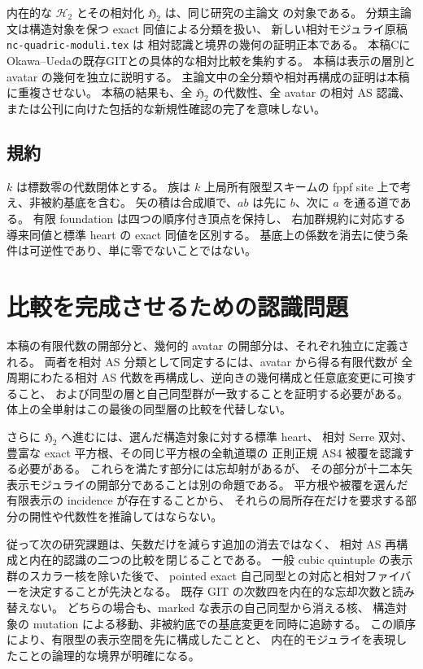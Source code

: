 \documentclass[a4paper,11pt]{ltjsarticle}
\numberwithin{equation}{section}
\theoremstyle{plain}
\theoremstyle{definition}
\theoremstyle{remark}
\newcommand{\kk}{k}
\newcommand{\HH}{\mathcal H_2}
\newcommand{\HHstack}{\mathfrak H_2}
\begin{document}
内在的な $\HH$ とその相対化 $\HHstack$ は、同じ研究の主論文
\cite{QuadricIntrinsic2026} の対象である。
分類主論文は構造対象を保つ exact 同値による分類を扱い、
新しい相対モジュライ原稿 \texttt{nc-quadric-moduli.tex} は
相対認識と境界の幾何の証明正本である。
本稿CにOkawa--Uedaの既存GITとの具体的な相対比較を集約する。
本稿は表示の層別と avatar の幾何を独立に説明する。
主論文中の全分類や相対再構成の証明は本稿に重複させない。
本稿の結果も、全 $\HHstack$ の代数性、全 avatar の相対 AS 認識、
または公刊に向けた包括的な新規性確認の完了を意味しない。

\subsection{規約}

$\kk$ は標数零の代数閉体とする。
族は $\kk$ 上局所有限型スキームの fppf site 上で考え、非被約基底を含む。
矢の積は合成順で、$ab$ は先に $b$、次に $a$ を通る道である。
有限 foundation は四つの順序付き頂点を保持し、
右加群規約に対応する導来同値と標準 heart の exact 同値を区別する。
基底上の係数を消去に使う条件は可逆性であり、単に零でないことではない。










\section{比較を完成させるための認識問題}
\label{sec:qa-remaining}

本稿の有限代数の開部分と、幾何的 avatar の開部分は、それぞれ独立に定義される。
両者を相対 AS 分類として同定するには、avatar から得る有限代数が
全周期にわたる相対 AS 代数を再構成し、逆向きの幾何構成と任意底変更に可換すること、
および同型の層と自己同型群が一致することを証明する必要がある。
体上の全単射はこの最後の同型層の比較を代替しない。

さらに $\HHstack$ へ進むには、選んだ構造対象に対する標準 heart、
相対 Serre 双対、豊富な exact 平方根、その同じ平方根の全軌道環の
正則正規 AS4 被覆を認識する必要がある。
これらを満たす部分には忘却射があるが、
その部分が十二本矢表示モジュライの開部分であることは別の命題である。
平方根や被覆を選んだ有限表示の incidence が存在することから、
それらの局所存在だけを要求する部分の開性や代数性を推論してはならない。

従って次の研究課題は、矢数だけを減らす追加の消去ではなく、
相対 AS 再構成と内在的認識の二つの比較を閉じることである。
一般 cubic quintuple の表示群のスカラー核を除いた後で、
pointed exact 自己同型との対応と相対ファイバーを決定することが先決となる。
既存 GIT の次数四を内在的な忘却次数と読み替えない。
どちらの場合も、marked な表示の自己同型から消える核、
構造対象の mutation による移動、非被約底での基底変更を同時に追跡する。
この順序により、有限型の表示空間を先に構成したことと、
内在的モジュライを表現したことの論理的な境界が明確になる。



\end{document}
